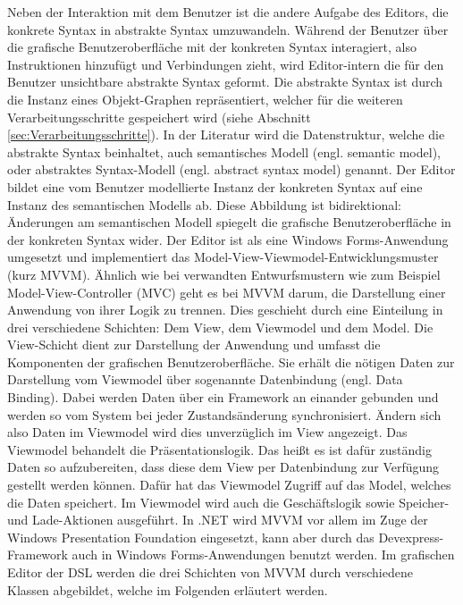 \noindent Neben der Interaktion mit dem Benutzer ist die andere Aufgabe des Editors, die konkrete Syntax in abstrakte Syntax umzuwandeln. Während der Benutzer über die grafische Benutzeroberfläche mit der konkreten Syntax interagiert, also Instruktionen hinzufügt und Verbindungen zieht, wird Editor-intern die für den Benutzer unsichtbare abstrakte Syntax geformt. Die abstrakte Syntax ist durch die Instanz eines Objekt-Graphen repräsentiert, welcher für die weiteren Verarbeitungsschritte gespeichert wird (siehe Abschnitt \ref{sec:Verarbeitungsschritte}). In der Literatur wird die Datenstruktur, welche die abstrakte Syntax beinhaltet, auch semantisches Modell (engl. semantic model)\cite[S. 159ff]{Fowler:11}, oder abstraktes Syntax-Modell (engl. abstract syntax model)\cite[S. 78ff]{Kleppe:09} genannt. Der Editor bildet eine vom Benutzer modellierte Instanz der konkreten Syntax auf eine Instanz des semantischen Modells ab. Diese Abbildung ist bidirektional: Änderungen am semantischen Modell spiegelt die grafische Benutzeroberfläche in der konkreten Syntax wider. 
\newline
Der Editor ist als eine Windows Forms-Anwendung umgesetzt und implementiert das Model-View-Viewmodel-Entwicklungsmuster (kurz MVVM). Ähnlich wie bei verwandten Entwurfsmustern wie zum Beispiel Model-View-Controller (MVC) geht es bei MVVM darum, die Darstellung einer Anwendung von ihrer Logik zu trennen. Dies geschieht durch eine Einteilung in drei verschiedene Schichten: Dem View, dem Viewmodel und dem Model. Die View-Schicht dient zur Darstellung der Anwendung und umfasst die Komponenten der grafischen Benutzeroberfläche. Sie erhält die nötigen Daten zur Darstellung vom Viewmodel über sogenannte Datenbindung (engl. Data Binding). Dabei werden Daten über ein Framework an einander gebunden und werden so vom System bei jeder Zustandsänderung synchronisiert. Ändern sich also Daten im Viewmodel wird dies unverzüglich im View angezeigt. 
\newpage
\noindent Das Viewmodel behandelt die Präsentationslogik. Das heißt es ist dafür zuständig Daten so aufzubereiten, dass diese dem View per Datenbindung zur Verfügung gestellt werden können. Dafür hat das Viewmodel Zugriff auf das Model, welches die Daten speichert. Im Viewmodel wird auch die Geschäftslogik sowie Speicher- und Lade-Aktionen ausgeführt. In .NET wird MVVM vor allem im Zuge der Windows Presentation Foundation eingesetzt, kann aber durch das Devexpress-Framework auch in Windows Forms-Anwendungen benutzt werden. 
\newline
Im grafischen Editor der DSL werden die drei Schichten von MVVM durch verschiedene Klassen abgebildet, welche im Folgenden erläutert werden.

